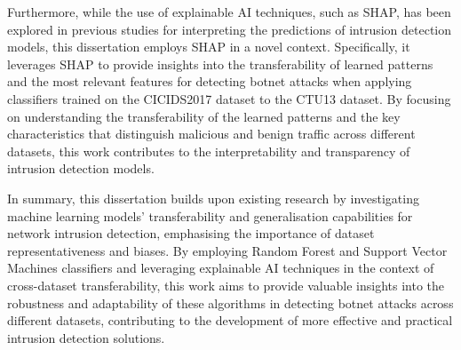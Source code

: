 Furthermore, while the use of explainable AI techniques, such as SHAP, has been explored in previous studies for interpreting the predictions of intrusion detection models, this dissertation employs SHAP in a novel context. Specifically, it leverages SHAP to provide insights into the transferability of learned patterns and the most relevant features for detecting botnet attacks when applying classifiers trained on the CICIDS2017 dataset to the CTU13 dataset. By focusing on understanding the transferability of the learned patterns and the key characteristics that distinguish malicious and benign traffic across different datasets, this work contributes to the interpretability and transparency of intrusion detection models.

In summary, this dissertation builds upon existing research by investigating machine learning models’ transferability and generalisation capabilities for network intrusion detection, emphasising the importance of dataset representativeness and biases. By employing Random Forest and Support Vector Machines classifiers and leveraging explainable AI techniques in the context of cross-dataset transferability, this work aims to provide valuable insights into the robustness and adaptability of these algorithms in detecting botnet attacks across different datasets, contributing to the development of more effective and practical intrusion detection solutions.